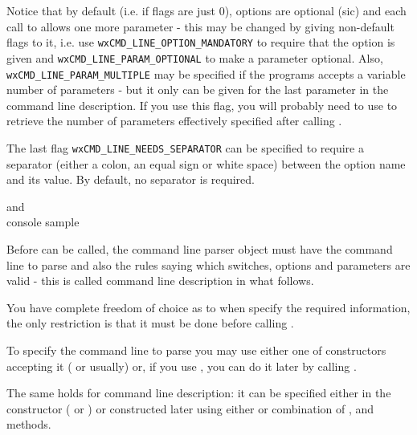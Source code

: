 Notice that by default (i.e. if flags are just $0$), options are optional (sic)
and each call to  allows one more
parameter - this may be changed by giving non-default flags to it, i.e. use 
{\tt wxCMD\_LINE\_OPTION\_MANDATORY} to require that the option is given and 
{\tt wxCMD\_LINE\_PARAM\_OPTIONAL} to make a parameter optional. Also, 
{\tt wxCMD\_LINE\_PARAM\_MULTIPLE} may be specified if the programs accepts a
variable number of parameters - but it only can be given for the last parameter
in the command line description. If you use this flag, you will probably need to
use  to retrieve the number
of parameters effectively specified after calling 
.

The last flag {\tt wxCMD\_LINE\_NEEDS\_SEPARATOR} can be specified to require a
separator (either a colon, an equal sign or white space) between the option
name and its value. By default, no separator is required.


 and \\
console sample



\label{wxcmdlineparserconstruction}

Before  can be called, the command line
parser object must have the command line to parse and also the rules saying
which switches, options and parameters are valid - this is called command line
description in what follows.

You have complete freedom of choice as to when specify the required information,
the only restriction is that it must be done before calling 
.

To specify the command line to parse you may use either one of constructors
accepting it ( or 
 usually) or,
if you use ,
you can do it later by calling 
.

The same holds for command line description: it can be specified either in
the constructor ( or 
) or
constructed later using either  or
combination of , 
 and 
 methods.

